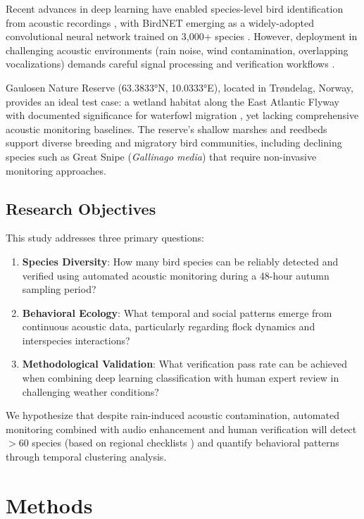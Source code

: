 \documentclass[twocolumn]{article}
\begin{document}
Recent advances in deep learning have enabled species-level bird identification from acoustic recordings \citep{Kahl2021}, with BirdNET emerging as a widely-adopted convolutional neural network trained on 3,000+ species \citep{Wood2022}. However, deployment in challenging acoustic environments (rain noise, wind contamination, overlapping vocalizations) demands careful signal processing and verification workflows \citep{Stowell2019}.

Gaulosen Nature Reserve (63.3833°N, 10.0333°E), located in Trøndelag, Norway, provides an ideal test case: a wetland habitat along the East Atlantic Flyway with documented significance for waterfowl migration \citep{Kålås1995}, yet lacking comprehensive acoustic monitoring baselines. The reserve's shallow marshes and reedbeds support diverse breeding and migratory bird communities, including declining species such as Great Snipe (\textit{Gallinago media}) that require non-invasive monitoring approaches.

\subsection{Research Objectives}

This study addresses three primary questions:

\begin{enumerate}
\item \textbf{Species Diversity}: How many bird species can be reliably detected and verified using automated acoustic monitoring during a 48-hour autumn sampling period?

\item \textbf{Behavioral Ecology}: What temporal and social patterns emerge from continuous acoustic data, particularly regarding flock dynamics and interspecies interactions?

\item \textbf{Methodological Validation}: What verification pass rate can be achieved when combining deep learning classification with human expert review in challenging weather conditions?
\end{enumerate}

We hypothesize that despite rain-induced acoustic contamination, automated monitoring combined with audio enhancement and human verification will detect $>$60 species (based on regional checklists \citep{Artsdatabanken2023}) and quantify behavioral patterns through temporal clustering analysis.

\section{Methods}
\end{document}
